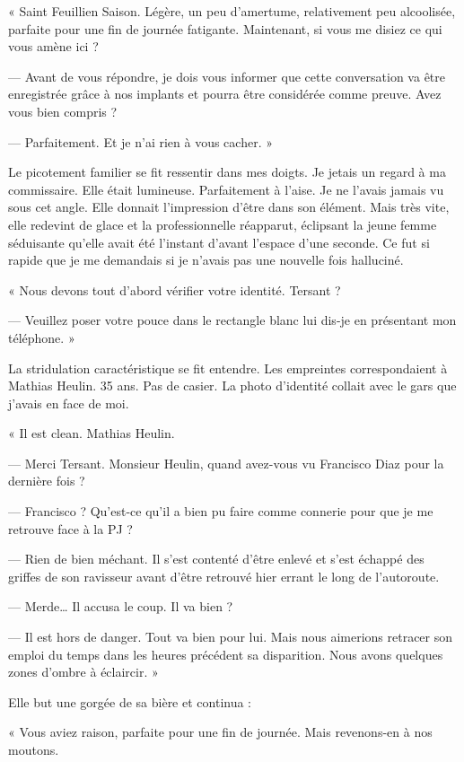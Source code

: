 « Saint Feuillien Saison. Légère, un peu d'amertume, relativement peu alcoolisée, parfaite pour une fin de journée 
fatigante. Maintenant, si vous me disiez ce qui vous amène ici ?

— Avant de vous répondre, je dois vous informer que cette conversation va être enregistrée grâce à nos implants et 
pourra être considérée comme preuve. Avez vous bien compris ?

— Parfaitement. Et je n'ai rien à vous cacher. »

Le picotement familier se fit ressentir dans mes doigts. Je jetais un regard à ma commissaire. Elle était lumineuse. 
Parfaitement à l'aise. Je ne l'avais jamais vu sous cet angle. Elle donnait l'impression d'être dans son élément. Mais 
très vite, elle redevint de glace et la professionnelle réapparut, éclipsant la jeune femme séduisante qu'elle 
avait été l'instant d'avant l'espace d'une seconde. Ce fut si rapide que je me demandais si je n'avais pas une nouvelle 
fois halluciné.

« Nous devons tout d'abord vérifier votre identité. Tersant ?

— Veuillez poser votre pouce dans le rectangle blanc lui dis-je en présentant mon téléphone. »

La stridulation caractéristique se fit entendre. Les empreintes correspondaient à Mathias Heulin. 35 ans. Pas de 
casier. La photo d'identité collait avec le gars que j'avais en face de moi. 

« Il est clean. Mathias Heulin.

— Merci Tersant. Monsieur Heulin, quand avez-vous vu Francisco Diaz pour la dernière fois ?

— Francisco ? Qu'est-ce qu'il a bien pu faire comme connerie pour que je me retrouve face à la PJ ?

— Rien de bien méchant. Il s'est contenté d'être enlevé et s'est échappé des griffes de son ravisseur avant d'être 
retrouvé hier errant le long de l'autoroute.

— Merde… Il accusa le coup. Il va bien ?

— Il est hors de danger. Tout va bien pour lui. Mais nous aimerions retracer son emploi du temps dans les heures 
précédent sa disparition. Nous avons quelques zones d'ombre à éclaircir. »

Elle but une gorgée de sa bière et continua :

« Vous aviez raison, parfaite pour une fin de journée. Mais revenons-en à nos moutons.

